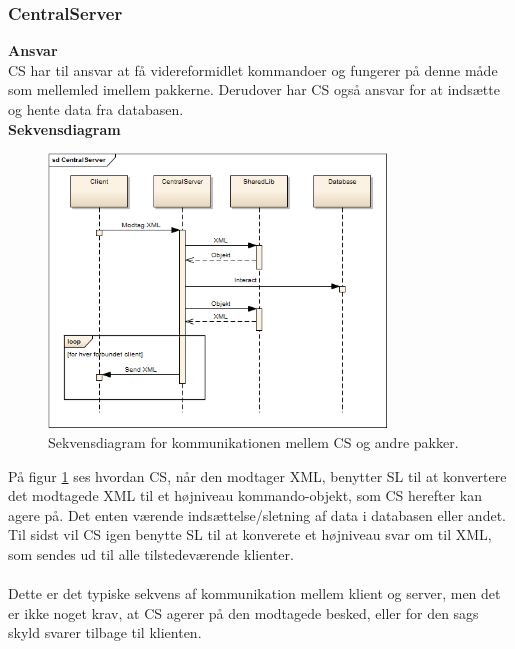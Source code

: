 \subsubsection{CentralServer}

\textbf{Ansvar}\\
\gls{CS} har til ansvar at få videreformidlet kommandoer og fungerer på denne måde som mellemled imellem pakkerne. Derudover har \gls{CS} også ansvar for at indsætte og hente data fra databasen.\\

\textbf{Sekvensdiagram}

\begin{figure}[H]
    \centering
    \includegraphics[width=0.8\textwidth]{Systemarkitektur/LogiskView/CentralServer.PNG}
    \caption{Sekvensdiagram for kommunikationen mellem \gls{CS} og andre pakker.}
    \label{fig:cssekv}
\end{figure}

På figur \ref{fig:cssekv} ses hvordan \gls{CS}, når den modtager XML, benytter \gls{SL} til at konvertere det modtagede XML til et højniveau kommando-objekt, som \gls{CS} herefter kan agere på. Det enten værende indsættelse/sletning af data i databasen eller andet. Til sidst vil \gls{CS} igen benytte \gls{SL} til at konverete et højniveau svar om til XML, som sendes ud til alle tilstedeværende klienter.\\\\

Dette er det typiske sekvens af kommunikation mellem klient og server, men det er ikke noget krav, at \gls{CS} agerer på den modtagede besked, eller for den sags skyld svarer tilbage til klienten.